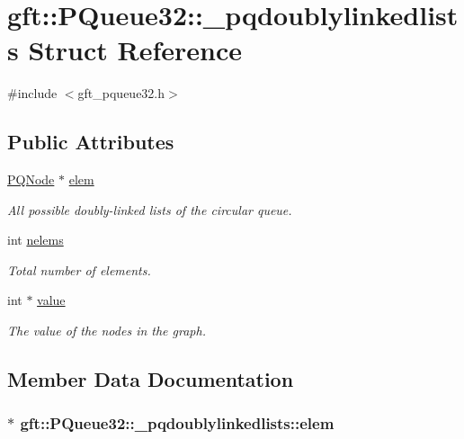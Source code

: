\hypertarget{structgft_1_1PQueue32_1_1__pqdoublylinkedlists}{\section{gft\-:\-:P\-Queue32\-:\-:\-\_\-pqdoublylinkedlists Struct Reference}
\label{structgft_1_1PQueue32_1_1__pqdoublylinkedlists}
}


{\ttfamily \#include $<$gft\-\_\-pqueue32.\-h$>$}

\subsection*{Public Attributes}
\begin{DoxyCompactItemize}
\item 
\hyperlink{namespacegft_1_1PQueue32_ae52de18ce37cbf998885ae2ea5843494}{P\-Q\-Node} $\ast$ \hyperlink{structgft_1_1PQueue32_1_1__pqdoublylinkedlists_aad37a02a88a1d2aad5428a0bd83a42fb}{elem}
\begin{DoxyCompactList}\small\item\em All possible doubly-\/linked lists of the circular queue. \end{DoxyCompactList}\item 
int \hyperlink{structgft_1_1PQueue32_1_1__pqdoublylinkedlists_aac1cff87642f59107cbec2ef52c8be11}{nelems}
\begin{DoxyCompactList}\small\item\em Total number of elements. \end{DoxyCompactList}\item 
int $\ast$ \hyperlink{structgft_1_1PQueue32_1_1__pqdoublylinkedlists_a97c614bd8679dc49d6134f1380e173ef}{value}
\begin{DoxyCompactList}\small\item\em The value of the nodes in the graph. \end{DoxyCompactList}\end{DoxyCompactItemize}


\subsection{Member Data Documentation}
\hypertarget{structgft_1_1PQueue32_1_1__pqdoublylinkedlists_aad37a02a88a1d2aad5428a0bd83a42fb}{
\subsubsection[{elem}]{$\ast$ gft\-::\-P\-Queue32\-::\-\_\-pqdoublylinkedlists\-::elem}}\label{structgft_1_1PQueue32_1_1__pqdoublylinkedlists_aad37a02a88a1d2aad5428a0bd83a42fb}


